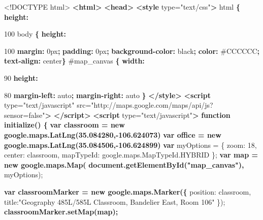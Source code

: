 \documentclass[]{article}
\newenvironment{Shaded}{}{}
\newcommand{\KeywordTok}[1]{\textcolor[rgb]{0.00,0.44,0.13}{\textbf{{#1}}}}
\newcommand{\DataTypeTok}[1]{\textcolor[rgb]{0.56,0.13,0.00}{{#1}}}
\newcommand{\DecValTok}[1]{\textcolor[rgb]{0.25,0.63,0.44}{{#1}}}
\newcommand{\FloatTok}[1]{\textcolor[rgb]{0.25,0.63,0.44}{{#1}}}
\newcommand{\StringTok}[1]{\textcolor[rgb]{0.25,0.44,0.63}{{#1}}}
\newcommand{\OtherTok}[1]{\textcolor[rgb]{0.00,0.44,0.13}{{#1}}}
\newcommand{\FunctionTok}[1]{\textcolor[rgb]{0.02,0.16,0.49}{{#1}}}
\newcommand{\ErrorTok}[1]{\textcolor[rgb]{1.00,0.00,0.00}{\textbf{{#1}}}}
\newcommand{\NormalTok}[1]{{#1}}
\begin{document}
\begin{Shaded}
\begin{Highlighting}[numbers=left,,]
\DataTypeTok{<!DOCTYPE }\NormalTok{html}\DataTypeTok{>}
\KeywordTok{<html>}
    \KeywordTok{<head>}
        \KeywordTok{<style}\OtherTok{ type=}\StringTok{"text/css"}\KeywordTok{>}
          \NormalTok{html }\KeywordTok{\{} \KeywordTok{height:} \DataTypeTok{100%
          \NormalTok{body }\KeywordTok{\{} \KeywordTok{height:} \DataTypeTok{100%
            \KeywordTok{margin:} \DataTypeTok{0px}\KeywordTok{;} 
            \KeywordTok{padding:} \DataTypeTok{0px}\KeywordTok{;} 
            \KeywordTok{background-color:} \DataTypeTok{black}\KeywordTok{;} 
            \KeywordTok{color:} \DataTypeTok{#CCCCCC}\KeywordTok{;}
            \KeywordTok{text-align:} \DataTypeTok{center}\KeywordTok{\}}
          \FloatTok{#map_canvas} \KeywordTok{\{} \KeywordTok{width:}\DataTypeTok{90%
            \KeywordTok{height:}\DataTypeTok{80%
            \KeywordTok{margin-left:} \DataTypeTok{auto}\KeywordTok{;} 
            \KeywordTok{margin-right:} \DataTypeTok{auto} \KeywordTok{\}}
        \KeywordTok{</style>}
        \KeywordTok{<script}\OtherTok{ type=}\StringTok{"text/javascript"}
\OtherTok{            src=}\StringTok{"http://maps.google.com/maps/api/js?sensor=false"}\KeywordTok{>}
        \KeywordTok{</script>}
        \KeywordTok{<script}\OtherTok{ type=}\StringTok{"text/javascript"}\KeywordTok{>}
\ErrorTok{          function initialize() \{}
\ErrorTok{            var classroom = new google.maps.LatLng(35.084280,-106.624073)}
\ErrorTok{            var office = new google.maps.LatLng(35.084506,-106.624899)}
            \KeywordTok{var} \NormalTok{myOptions = \{}
              \DataTypeTok{zoom}\NormalTok{: }\DecValTok{18}\NormalTok{,}
              \DataTypeTok{center}\NormalTok{: classroom,}
              \DataTypeTok{mapTypeId}\NormalTok{: }\OtherTok{google}\NormalTok{.}\OtherTok{maps}\NormalTok{.}\OtherTok{MapTypeId}\NormalTok{.}\FunctionTok{HYBRID}
              \NormalTok{\};}
\ErrorTok{            var map = new google.maps.Map(}
\ErrorTok{              document.getElementById("map_canvas"), }
              \NormalTok{myOptions);}
            
\ErrorTok{            var classroomMarker = new google.maps.Marker(\{}
              \NormalTok{position: classroom,}
              \NormalTok{title:}\StringTok{"Geography 485L/585L Classroom, Bandelier East, Room 106"}
              \NormalTok{\});}
\ErrorTok{            classroomMarker.setMap(map);}
            
}}}}
\end{Highlighting}
\end{Shaded}
\end{document}

